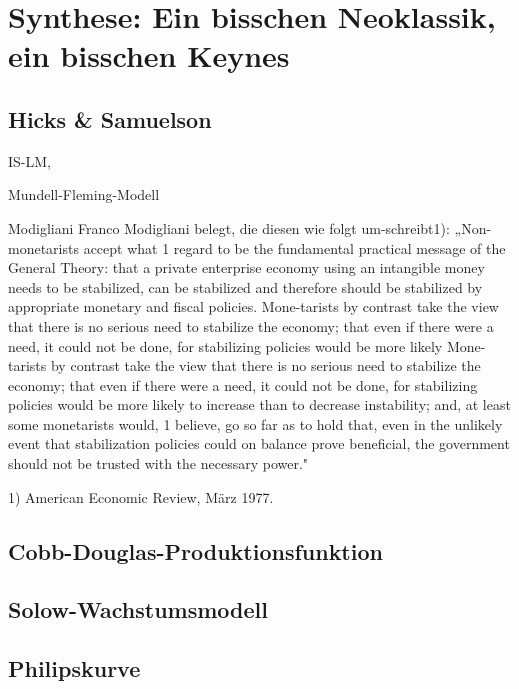 %
%
%

\chapter{Synthese: Ein bisschen Neoklassik, ein bisschen Keynes}
\label{Synthese}

\section{Hicks \& Samuelson}

IS-LM, 




Mundell-Fleming-Modell


Modigliani
Franco Modigliani belegt, die diesen wie folgt um-schreibt1): „Non-monetarists accept what 1 regard to be the fundamental practical message of the General Theory: that a private enterprise economy using an intangible money needs to be stabilized, can be stabilized and therefore should be stabilized by appropriate monetary and fiscal policies. Mone-tarists by contrast take the view that there is no serious need to stabilize the economy; that even if there were a need, it could not be done, for stabilizing policies would be more likely
Mone-tarists by contrast take the view that there is no serious need to stabilize the economy; that even if there were a need, it could not be done, for stabilizing policies would be more likely to increase than to decrease instability; and, at least some monetarists would, 1 believe, go so far as to hold that, even in the unlikely event that stabilization policies could on balance prove beneficial, the government should not be trusted with the necessary power."

1) American Economic Review, März 1977.




\section{Cobb-Douglas-Produktionsfunktion}

\section{Solow-Wachstumsmodell}


\section{Philipskurve}

